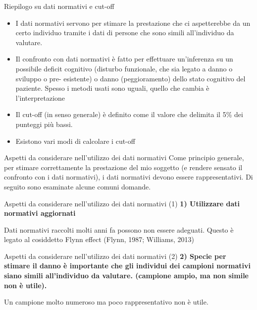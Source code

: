 \documentclass[
  ignorenonframetext,
  aspectratio=169,
]{beamer}
\begin{document}
\begin{frame}{Riepilogo su dati normativi e cut-off}
\label{riepilogo-su-dati-normativi-e-cut-off}
\small

\begin{itemize}
\item
  I dati normativi servono per stimare la prestazione che ci
  aspetterebbe da un certo individuo tramite i dati di persone che sono
  simili all'individuo da valutare.
\item
  Il confronto con dati normativi è fatto per effettuare un'inferenza su
  un possibile deficit cognitivo (disturbo funzionale, che sia legato a
  danno o sviluppo o pre- esistente) o danno (peggioramento) dello stato
  cognitivo del paziente. Spesso i metodi usati sono uguali, quello che
  cambia è l'interpretazione
\item
  Il cut-off (in senso generale) è definito come il valore che delimita
  il 5\% dei punteggi più bassi.
\item
  Esistono vari modi di calcolare i cut-off
\end{itemize}
\end{frame}

\begin{frame}{Aspetti da considerare nell'utilizzo dei dati normativi}
\label{aspetti-da-considerare-nellutilizzo-dei-dati-normativi}
Come principio generale, per stimare correttamente la prestazione del
mio soggetto (e rendere sensato il confronto con i dati normativi), i
dati normativi devono essere rappresentativi. Di seguito sono esaminate
alcune comuni domande.
\end{frame}

\begin{frame}{Aspetti da considerare nell'utilizzo dei dati normativi
(1)}
\label{aspetti-da-considerare-nellutilizzo-dei-dati-normativi-1}
\textbf{1) Utilizzare dati normativi aggiornati} \vspace{2em}

Dati normativi raccolti molti anni fa possono non essere adeguati.
Questo è legato al cosiddetto Flynn effect (Flynn, 1987; Williams, 2013)
\end{frame}

\begin{frame}{Aspetti da considerare nell'utilizzo dei dati normativi
(2)}
\label{aspetti-da-considerare-nellutilizzo-dei-dati-normativi-2}
\textbf{2) Specie per stimare il danno è importante che gli individui
dei campioni normativi siano simili all'individuo da valutare. (campione
ampio, ma non simile non è utile).} \vspace{2em}

Un campione molto numeroso ma poco rappresentativo non è utile.
\end{frame}
\end{document}
